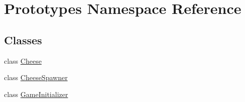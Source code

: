 \hypertarget{namespace_prototypes}{}\section{Prototypes Namespace Reference}
\label{namespace_prototypes}
\subsection*{Classes}
\begin{DoxyCompactItemize}
\item 
class \mbox{\hyperlink{class_prototypes_1_1_cheese}{Cheese}}
\item 
class \mbox{\hyperlink{class_prototypes_1_1_cheese_spawner}{Cheese\+Spawner}}
\item 
class \mbox{\hyperlink{class_prototypes_1_1_game_initializer}{Game\+Initializer}}
\end{DoxyCompactItemize}
